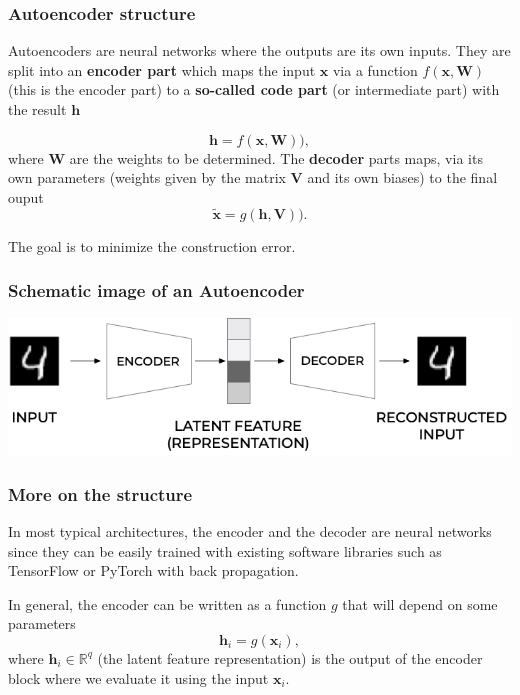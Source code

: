 \documentclass{beamer}
\begin{document}
\begin{frame}
\frametitle{Autoencoder structure}

Autoencoders are neural networks where the outputs are its own
inputs. They are split into an \textbf{encoder part}
which maps the input $\bm{x}$ via a function $f(\bm{x},\bm{W})$ (this
is the encoder part) to a \textbf{so-called code part} (or intermediate part)
with the result $\bm{h}$

\[
\bm{h} = f(\bm{x},\bm{W})),
\]
where $\bm{W}$ are the weights to be determined.  The \textbf{decoder} parts maps, via its own parameters (weights given by the matrix $\bm{V}$ and its own biases) to 
the final ouput
\[
\tilde{\bm{x}} = g(\bm{h},\bm{V})).
\]

The goal is to minimize the construction error.
\end{frame}

\begin{frame}
\frametitle{Schematic image of an Autoencoder}

\vspace{6mm}

\centerline{\includegraphics[width=1.0\linewidth]{figures/ae1.png}}

\vspace{6mm}
\end{frame}

\begin{frame}
\frametitle{More on the structure}

In most typical architectures, the encoder and the decoder are neural networks
since they can be easily trained with existing software libraries such as TensorFlow or PyTorch with back propagation.

In general, the encoder can be written as a function $g$ that will depend on some parameters
\[
\mathbf{h}_{i} = g(\mathbf{x}_{i}),
\]
where $\mathbf{h}_{i}\in\mathbb{R}^{q}$  (the latent feature representation) is the output of the encoder block where we evaluate
it using the input $\mathbf{x}_{i}$.
\end{frame}
\end{document}
